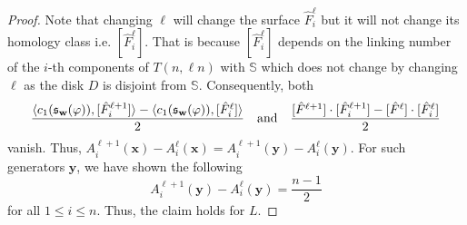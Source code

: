 \documentclass{amsart}
\newcommand{\s}{\mathfrak{s}}
\newcommand{\w}{\mathbf{w}}
\newcommand{\x}{\mathbf{x}}
\newcommand{\y}{\mathbf{y}}
\def\w{{\bf{w}}}
\def\x{\mathbf{x}}
\def\y{\mathbf{y}}
\renewcommand{\AA}[1]{{\color{blue}#1}}
\newcommand{\BL}[1]{{\color{purple}#1--Beibei}}
\begin{document}
\begin{proof}
Note that changing $\ell$ will change the surface $\hat{F}_{i}^{\ell}$ but it  will not change its homology class i.e. $[\hat{F}_i^{\ell}]$. That is because $[\hat{F}_i^{\ell}]$ depends on the linking number of the $i$-th components of $T(n,\ell n)$ with $\mathbb{S}$ which does not change by changing $\ell$ as the disk $D$ is disjoint from $\mathbb{S}$. Consequently, both 
\[\frac{\langle c_1(\s_{\w}(\varphi)),[\hat{F}^{\ell+1}_i]\rangle-\langle c_1(\s_{\w}(\varphi)),[\hat{F}^{\ell}_i]\rangle}{2}\ \ \ \text{and}\ \ \ \frac{[\hat{F}^{\ell+1}]\cdot[\hat{F}^{\ell+1}_i]-[\hat{F}^{\ell}]\cdot[\hat{F}^{\ell}_i]}{2}\]
vanish. 
Thus, $A_i^{\ell+1}(\x)-A_i^{\ell}(\x)=A_i^{\ell+1}(\y)-A_i^{\ell}(\y)$. For such generators $\y$, we have shown the following
$$A_i^{\ell+1}(\y)-A_i^{\ell}(\y)=\dfrac{n-1}{2}$$
for all $1\leq i\leq n$. Thus, the claim holds for $L$.









 







\end{proof}
\end{document}
